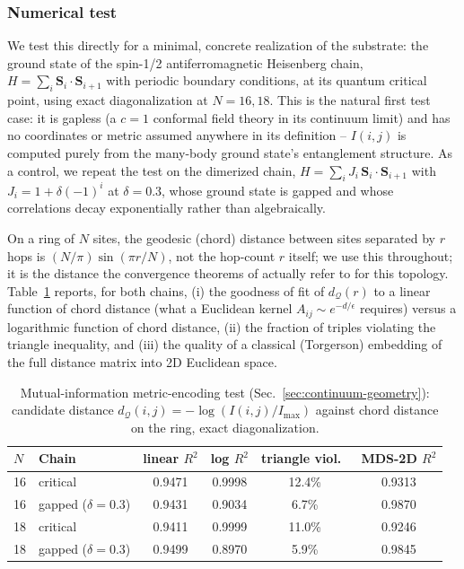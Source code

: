 \documentclass[11pt]{article}
\begin{document}
\subsubsection*{Numerical test}

We test this directly for a minimal, concrete realization of the substrate: the ground state of the spin-1/2 antiferromagnetic Heisenberg chain, $H=\sum_i \mathbf{S}_i\cdot\mathbf{S}_{i+1}$ with periodic boundary conditions, at its quantum critical point, using exact diagonalization at $N=16,18$. This is the natural first test case: it is gapless (a $c=1$ conformal field theory in its continuum limit) and has no coordinates or metric assumed anywhere in its definition -- $I(i,j)$ is computed purely from the many-body ground state's entanglement structure. As a control, we repeat the test on the dimerized chain, $H=\sum_i J_i\, \mathbf{S}_i\cdot\mathbf{S}_{i+1}$ with $J_i=1+\delta(-1)^i$ at $\delta=0.3$, whose ground state is gapped and whose correlations decay exponentially rather than algebraically.

On a ring of $N$ sites, the geodesic (chord) distance between sites separated by $r$ hops is $(N/\pi)\sin(\pi r/N)$, not the hop-count $r$ itself; we use this throughout; it is the distance the convergence theorems of \cite{BelkinNiyogi,Singer} actually refer to for this topology. Table~\ref{tab:metric-test} reports, for both chains, (i) the goodness of fit of $d_\mathcal{Q}(r)$ to a linear function of chord distance (what a Euclidean kernel $A_{ij}\sim e^{-d/\epsilon}$ requires) versus a logarithmic function of chord distance, (ii) the fraction of triples violating the triangle inequality, and (iii) the quality of a classical (Torgerson) embedding of the full distance matrix into 2D Euclidean space.

\begin{table}[h]
\centering
\caption{Mutual-information metric-encoding test (Sec.~\ref{sec:continuum-geometry}): candidate distance $d_\mathcal{Q}(i,j)=-\log(I(i,j)/I_{\max})$ against chord distance on the ring, exact diagonalization.}
\label{tab:metric-test}
\begin{tabular}{@{}llcccc@{}}
\toprule
$N$ & Chain & linear $R^2$ & log $R^2$ & triangle viol.\ & MDS-2D $R^2$ \\
\midrule
16 & critical & 0.9471 & 0.9998 & 12.4\% & 0.9313 \\
16 & gapped ($\delta=0.3$) & 0.9431 & 0.9034 & 6.7\% & 0.9870 \\
18 & critical & 0.9411 & 0.9999 & 11.0\% & 0.9246 \\
18 & gapped ($\delta=0.3$) & 0.9499 & 0.8970 & 5.9\% & 0.9845 \\
\bottomrule
\end{tabular}
\end{table}
\end{document}
